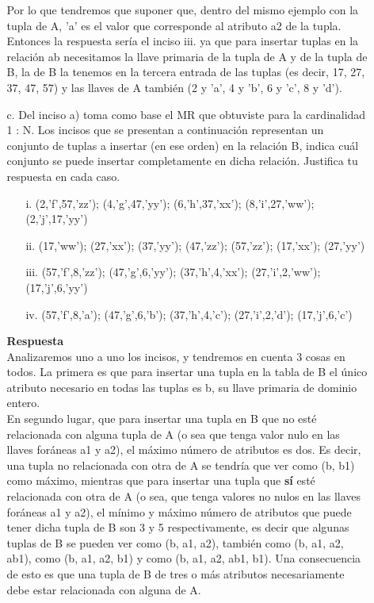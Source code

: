 \documentclass[12pt,a4paper]{article}
\begin{document}
\begin{enumerate}
\begin{enumerate}
				Por lo que tendremos que suponer que, dentro del mismo ejemplo con la tupla de A, 'a' es el valor que corresponde al atributo a2 de la tupla. Entonces la respuesta sería el inciso iii. ya que para insertar tuplas en la relación ab necesitamos la llave primaria de la tupla de A y de la tupla de B, la de B la tenemos en la tercera entrada de las tuplas (es decir, 17, 27, 37, 47, 57) y las llaves de A también (2 y 'a', 4 y 'b', 6 y 'c', 8 y 'd').\\


				\pagebreak
			\item[c.] Del inciso a) toma como base el MR que obtuviste para la cardinalidad 1 : N.
				Los incisos que se presentan a continuación representan un conjunto de tuplas a insertar
				(en ese orden) en la relación B, indica cuál conjunto se puede insertar completamente
				en dicha relación. Justifica tu respuesta en cada caso.

				\begin{enumerate}
					\item[i.] (2,’f’,57,’zz’); (4,’g’,47,’yy’); (6,’h’,37,’xx’); (8,’i’,27,’ww’); (2,’j’,17,’yy’)\\
					\item[ii.] (17,’ww’); (27,’xx’); (37,’yy’); (47,’zz’); (57,’zz’); (17,’xx’); (27,’yy’)\\
					\item[iii.] (57,’f’,8,’zz’); (47,’g’,6,’yy’); (37,’h’,4,’xx’); (27,’i’,2,’ww’); (17,’j’,6,’yy’)\\
					\item[iv.] (57,’f’,8,’a’); (47,’g’,6,’b’); (37,’h’,4,’c’); (27,’i’,2,’d’); (17,’j’,6,’c’)\\
				\end{enumerate}
				
				\textbf{Respuesta}\\
				Analizaremos uno a uno los incisos, y tendremos en cuenta 3 cosas en todos. La primera es que para insertar una tupla en la tabla de B el único atributo necesario en todas las tuplas es b, su llave primaria de dominio entero. \\
				En segundo lugar, que para insertar una tupla en B que no esté relacionada con alguna tupla de A (o sea que tenga valor nulo en las llaves foráneas a1 y a2), el máximo número de atributos es dos. Es decir, una tupla no relacionada con otra de A se tendría que ver como (b, b1) como máximo, mientras que para insertar una tupla que \textbf{sí} esté relacionada con otra de A (o sea, que tenga valores no nulos en las llaves foráneas a1 y a2), el mínimo y máximo número de atributos que puede tener dicha tupla de B son 3 y 5 respectivamente, es decir que algunas tuplas de B se pueden ver como (b, a1, a2), también como (b, a1, a2, ab1), como (b, a1, a2, b1) y como (b, a1, a2, ab1, b1). Una consecuencia de esto es que una tupla de B de tres o más atributos necesariamente debe estar relacionada con alguna de A.\\


\end{enumerate}
\end{enumerate}
\end{document}
